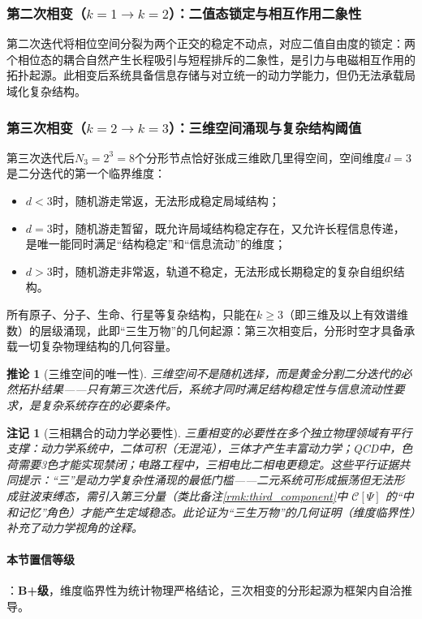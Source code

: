 \documentclass[12pt,a4paper,twocolumn]{article}
\newtheorem{corollary}[theorem]{推论}
\newtheorem{remark}[theorem]{注记}
\begin{document}
\subsubsection{第二次相变（$k=1\to k=2$）：二值态锁定与相互作用二象性}
第二次迭代将相位空间分裂为两个正交的稳定不动点，对应二值自由度的锁定：两个相位态的耦合自然产生长程吸引与短程排斥的二象性，是引力与电磁相互作用的拓扑起源。此相变后系统具备信息存储与对立统一的动力学能力，但仍无法承载局域化复杂结构。

\subsubsection{第三次相变（$k=2\to k=3$）：三维空间涌现与复杂结构阈值}
第三次迭代后$N_3=2^3=8$个分形节点恰好张成三维欧几里得空间，空间维度$d=3$是二分迭代的第一个临界维度：
\begin{itemize}
\item $d<3$时，随机游走常返，无法形成稳定局域结构；
\item $d=3$时，随机游走暂留，既允许局域结构稳定存在，又允许长程信息传递，是唯一能同时满足``结构稳定''和``信息流动''的维度；
\item $d>3$时，随机游走非常返，轨道不稳定，无法形成长期稳定的复杂自组织结构。
\end{itemize}
所有原子、分子、生命、行星等复杂结构，只能在$k\geq3$（即三维及以上有效谱维数）的层级涌现，此即``三生万物''的几何起源：第三次相变后，分形时空才具备承载一切复杂物理结构的几何容量。

\begin{corollary}[三维空间的唯一性]
三维空间不是随机选择，而是黄金分割二分迭代的必然拓扑结果——只有第三次迭代后，系统才同时满足结构稳定性与信息流动性要求，是复杂系统存在的必要条件。
\end{corollary}

\begin{remark}[三相耦合的动力学必要性]
\label{rmk:three_phase_necessity}
三重相变的必要性在多个独立物理领域有平行支撑：动力学系统中，二体可积（无混沌），三体才产生丰富动力学；QCD中，色荷需要3色才能实现禁闭；电路工程中，三相电比二相电更稳定。这些平行证据共同提示：``三''是动力学复杂性涌现的最低门槛——二元系统可形成振荡但无法形成驻波束缚态，需引入第三分量（类比备注\ref{rmk:third_component}中 $\mathcal{C}[\Psi]$ 的``中和记忆''角色）才能产生定域稳态。此论证为``三生万物''的几何证明（维度临界性）补充了动力学视角的诠释。
\end{remark}

\paragraph{本节置信等级}：\textbf{B+级}，维度临界性为统计物理严格结论，三次相变的分形起源为框架内自洽推导。
\end{document}
